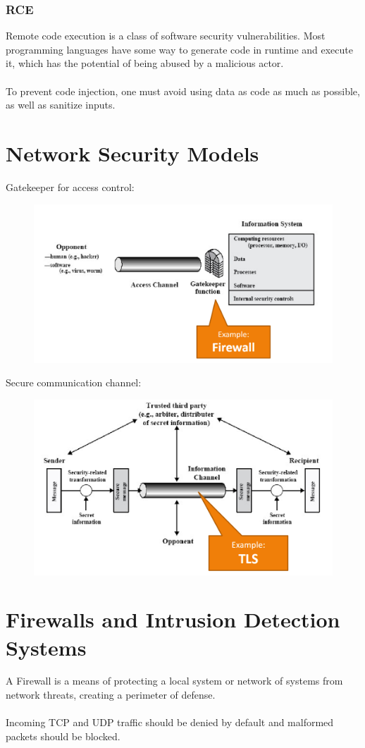 \documentclass[10pt,a4paper]{report}
\begin{document}
\subsubsection{RCE}
Remote code execution is a  class of software security vulnerabilities. Most programming languages have some way to generate code in runtime and execute it, which has the potential of being abused by a malicious actor.\\
\\
To prevent code injection, one must avoid using data as code as much as possible, as well as sanitize inputs.
\section{Network Security Models}
Gatekeeper for access control:
\begin{figure}[H]
\centering
\includegraphics[scale=0.45]{14.png}
\end{figure}
Secure communication channel:
\begin{figure}[H]
\centering
\includegraphics[scale=0.45]{15.png}
\end{figure}
\section{Firewalls and Intrusion Detection Systems}
A Firewall is a means of protecting a local system or network of systems from network threats, creating a perimeter of defense.\\
\\
Incoming TCP and UDP traffic should be denied by default and malformed packets should be blocked.
\end{document}
